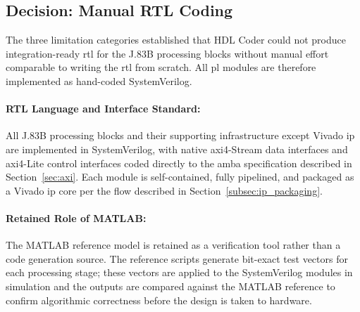 \subsection{Decision: Manual RTL Coding}
\label{subsec:manual_rtl_decision}

The three limitation categories established that HDL Coder could not
produce integration-ready \ac{rtl} for the J.83B processing blocks
without manual effort comparable to writing the \ac{rtl} from scratch.
All \ac{pl} modules are therefore implemented as hand-coded
SystemVerilog.

\paragraph{RTL Language and Interface Standard:}
All J.83B processing blocks and their supporting infrastructure
except Vivado \ac{ip} are implemented in SystemVerilog, with native
\ac{axi}4-Stream data interfaces and \ac{axi}4-Lite control interfaces
coded directly to the \ac{amba} specification described in
Section~\ref{sec:axi}.
Each module is self-contained, fully pipelined, and packaged as a
Vivado \ac{ip} core per the flow described in
Section~\ref{subsec:ip_packaging}.

\paragraph{Retained Role of MATLAB:}
The MATLAB reference model is retained as a verification tool rather
than a code generation source.
The reference scripts generate bit-exact test vectors for each
processing stage; these vectors are applied to the SystemVerilog
modules in simulation and the outputs are compared against the MATLAB
reference to confirm algorithmic correctness before the design is
taken to hardware.

\clearpage